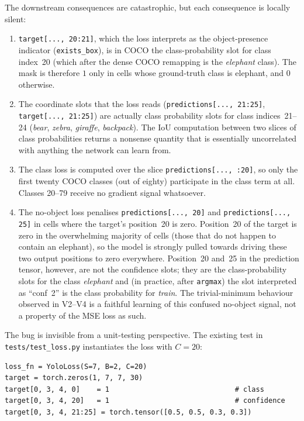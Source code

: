 The downstream consequences are catastrophic, but each consequence is locally
silent:
\begin{enumerate}
    \item \texttt{target[..., 20:21]}, which the loss interprets as the
        object-presence indicator (\texttt{exists\_box}), is in COCO the
        class-probability slot for class index~20 (which after the dense COCO
        remapping is the \emph{elephant} class). The mask is therefore $1$
        only in cells whose ground-truth class is elephant, and $0$ otherwise.
    \item The coordinate slots that the loss reads
        (\texttt{predictions[..., 21:25]}, \texttt{target[..., 21:25]}) are
        actually class probability slots for class indices~21--24
        (\emph{bear}, \emph{zebra}, \emph{giraffe}, \emph{backpack}). The IoU
        computation between two slices of class probabilities returns a
        nonsense quantity that is essentially uncorrelated with anything the
        network can learn from.
    \item The class loss is computed over the slice
        \texttt{predictions[..., :20]}, so only the first twenty COCO classes
        (out of eighty) participate in the class term at all. Classes 20--79
        receive no gradient signal whatsoever.
    \item The no-object loss penalises \texttt{predictions[..., 20]} and
        \texttt{predictions[..., 25]} in cells where the target's position~20
        is zero. Position~20 of the target is zero in the overwhelming
        majority of cells (those that do not happen to contain an elephant),
        so the model is strongly pulled towards driving these two output
        positions to zero everywhere. Position~20 and~25 in the prediction
        tensor, however, are not the confidence slots; they are the
        class-probability slots for the class \emph{elephant} and (in
        practice, after \texttt{argmax}) the slot interpreted as ``conf~2''
        is the class probability for \emph{train}. The trivial-minimum
        behaviour observed in V2--V4 is a faithful learning of this confused
        no-object signal, not a property of the MSE loss as such.
\end{enumerate}

The bug is invisible from a unit-testing perspective. The existing test in
\texttt{tests/test\_loss.py} instantiates the loss with $C=20$:

\begin{lstlisting}[caption={Pre-fix unit test that passed for the wrong reason.},label=lst:voc-test]
loss_fn = YoloLoss(S=7, B=2, C=20)
target = torch.zeros(1, 7, 7, 30)
target[0, 3, 4, 0]    = 1                              # class
target[0, 3, 4, 20]   = 1                              # confidence
target[0, 3, 4, 21:25] = torch.tensor([0.5, 0.5, 0.3, 0.3])
\end{lstlisting}

